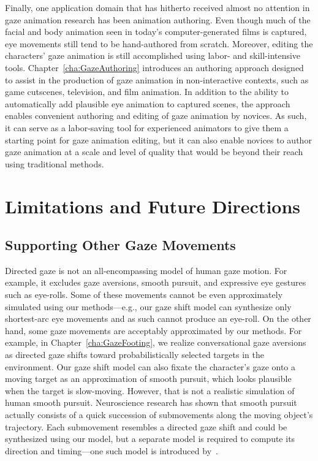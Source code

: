 Finally, one application domain that has hitherto received almost no attention in gaze animation research has been animation authoring. Even though much of the facial and body animation seen in today's computer-generated films is captured, eye movements still tend to be hand-authored from scratch. Moreover, editing the characters' gaze animation is still accomplished using labor- and skill-intensive tools. Chapter~\ref{cha:GazeAuthoring} introduces an authoring approach designed to assist in the production of gaze animation in non-interactive contexts, such as game cutscenes, television, and film animation. In addition to the ability to automatically add plausible eye animation to captured scenes, the approach enables convenient authoring and editing of gaze animation by novices. As such, it can serve as a labor-saving tool for experienced animators to give them a starting point for gaze animation editing, but it can also enable novices to author gaze animation at a scale and level of quality that would be beyond their reach using traditional methods.

\section{Limitations and Future Directions}

\subsection{Supporting Other Gaze Movements}

Directed gaze is not an all-encompassing model of human gaze motion. For example, it excludes gaze aversions, smooth pursuit, and expressive eye gestures such as eye-rolls. Some of these movements cannot be even approximately simulated using our methods---e.g., our gaze shift model can synthesize only shortest-arc eye movements and as such cannot produce an eye-roll. On the other hand, some gaze movements are acceptably approximated by our methods. For example, in Chapter~\ref{cha:GazeFooting}, we realize conversational gaze aversions as directed gaze shifts toward probabilistically selected targets in the environment. Our gaze shift model can also fixate the character's gaze onto a moving target as an approximation of smooth pursuit, which looks plausible when the target is slow-moving. However, that is not a realistic simulation of human smooth pursuit. Neuroscience research has shown that smooth pursuit actually consists of a quick succession of submovements along the moving object's trajectory. Each submovement resembles a directed gaze shift and could be synthesized using our model, but a separate model is required to compute its direction and timing---one such model is introduced by~\citet{yeo2012eyecatch}.

